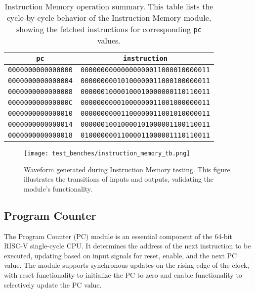 \documentclass[12pt]{article}
\begin{document}
\begin{table}[ht!]
    \centering
    \renewcommand{\arraystretch}{1.1}
    \setlength{\tabcolsep}{6pt}
    \begin{tabular}{|c|c|}
        \hline
        \textbf{\texttt{pc}} & \textbf{\texttt{instruction}} \\
        \hline
        \texttt{0000000000000000} & \texttt{00000000000000000011000010000011} \\
        \texttt{0000000000000004} & \texttt{00000000010100000011000100000011} \\
        \texttt{0000000000000008} & \texttt{00000010000100010000000110110011} \\
        \texttt{000000000000000C} & \texttt{00000000001000000011001000000011} \\
        \texttt{0000000000000010} & \texttt{00000000001100000011001010000011} \\
        \texttt{0000000000000014} & \texttt{00000010010000101000001100110011} \\
        \texttt{0000000000000018} & \texttt{01000000011000011000001110110011} \\
        \hline
    \end{tabular}
    \caption{Instruction Memory operation summary. This table lists the cycle-by-cycle behavior of the Instruction Memory module, showing the fetched instructions for corresponding \texttt{pc} values.}
    \label{tab:instruction_memory_results}
\end{table}

\begin{figure}[ht!]
    \centering
    \texttt{[image: test\_benches/instruction\_memory\_tb.png]}
    \caption{Waveform generated during Instruction Memory testing. This figure illustrates the transitions of inputs and outputs, validating the module's functionality.}
    \label{fig:instruction_memory_waveform}
\end{figure}

\subsection*{Program Counter}

The Program Counter (PC) module is an essential component of the 64-bit RISC-V single-cycle CPU. It determines the address of the next instruction to be executed, updating based on input signals for reset, enable, and the next PC value. The module supports synchronous updates on the rising edge of the clock, with reset functionality to initialize the PC to zero and enable functionality to selectively update the PC value.
\end{document}
